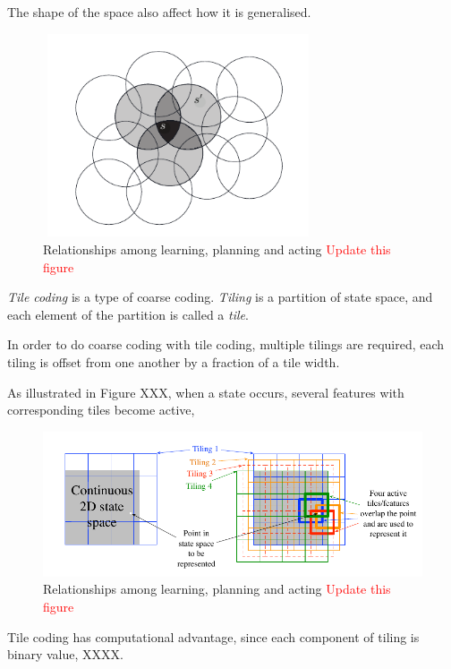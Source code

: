 \documentclass[12pt,twoside]{report}
\theoremstyle{plain}
\theoremstyle{definition}
\begin{document}
The shape of the space also affect how it is generalised. 

\begin{figure}[!htb]
\centering
\includegraphics[width=8cm, height=6cm]{./figures/coarse_coding}
\caption{Relationships among learning, planning and acting \textcolor{red}{Update this figure}}
\label{dyna}
\end{figure}

\textit{Tile coding} is a type of coarse coding. \textit{Tiling} is a partition of state space, and each element of the partition is called a \textit{tile}. 

In order to do coarse coding with tile coding, multiple tilings are required, each tiling is offset from one another by a fraction of a tile width. 

As illustrated in Figure XXX, when a state occurs, several features with corresponding tiles become active, 

\begin{figure}[!htb]
\centering
\includegraphics[width=1.0\textwidth]{./figures/tile_coding}
\caption{Relationships among learning, planning and acting \textcolor{red}{Update this figure}}
\label{dyna}
\end{figure}

Tile coding has computational advantage, since each component of tiling is binary value,  XXXX.
\end{document}
